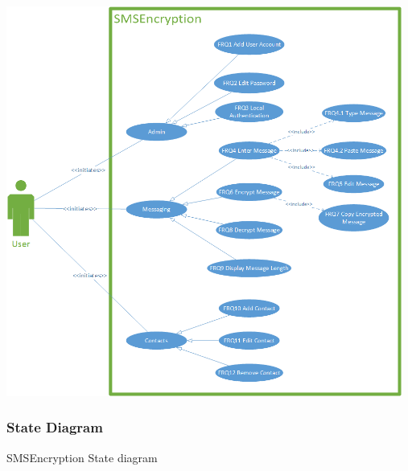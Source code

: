 \begin{center}
 \includegraphics[width=13cm]{diagrams/UseCaseDiagrams/UsecaseV4.png}
\end{center}

\subsubsection{State Diagram}
SMSEncryption State diagram


